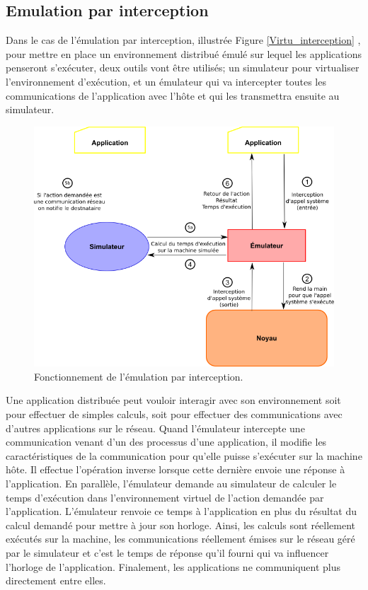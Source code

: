 \subsection{Emulation par interception}
\label{section:interception}

Dans le cas de l'émulation par interception, illustrée
Figure \ref{Virtu_interception} , pour mettre en place un environnement distribué
émulé sur lequel les applications penseront s'exécuter, deux outils vont être
utilisés; un simulateur pour virtualiser l'environnement d'exécution, et un
émulateur qui va intercepter toutes les communications de l'application avec l'hôte
et qui les transmettra ensuite au simulateur.

 \begin{figure}[H]
   \centering \includegraphics[scale=0.5]{Pictures/png/Emulation_fonctionnement}
   \caption{Fonctionnement de l'émulation par interception.}
   \label{INTERCEPTION}
 \end{figure}
 
 Une application distribuée peut vouloir interagir avec son environnement soit
 pour effectuer de simples calculs, soit pour effectuer des communications avec
 d'autres applications sur le réseau. Quand l'émulateur intercepte une
 communication venant d'un des processus d'une application, il modifie les
 caractéristiques de la communication pour qu'elle puisse s'exécuter sur la
 machine hôte. Il effectue l'opération inverse lorsque cette dernière envoie une réponse à
 l'application. En parallèle, l'émulateur demande au simulateur de calculer le
 temps d'exécution dans l'environnement virtuel de l'action
 demandée par l'application. L'émulateur renvoie ce temps à l'application en plus
 du résultat du calcul demandé pour mettre à jour son horloge. Ainsi, les
 calculs sont réellement exécutés sur la machine, les communications réellement
 émises sur le réseau géré par le simulateur et c'est le temps de réponse qu'il
 fourni qui va influencer l'horloge de l'application. Finalement, les
 applications ne communiquent plus directement entre elles.

\vspace{0.5cm}
